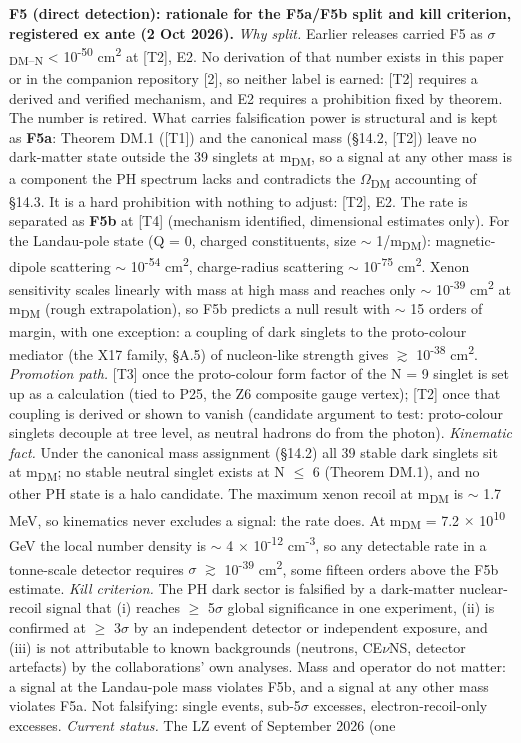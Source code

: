 \documentclass[11pt,letterpaper]{article}
\begin{document}
\noindent \textbf{F5 (direct detection): rationale for the F5a/F5b split and kill criterion, registered ex ante (2 Oct 2026). }\emph{Why split.} Earlier releases carried F5 as $\sigma$\textsubscript{DM--N} < 10\textsuperscript{-50} cm\textsuperscript{2} at [T2], E2. No derivation of that number exists in this paper or in the companion repository [2], so neither label is earned: [T2] requires a derived and verified mechanism, and E2 requires a prohibition fixed by theorem. The number is retired. What carries falsification power is structural and is kept as \textbf{F5a}: Theorem DM.1 ([T1]) and the canonical mass (§14.2, [T2]) leave no dark-matter state outside the 39 singlets at m\textsubscript{DM}, so a signal at any other mass is a component the PH spectrum lacks and contradicts the $\Omega$\textsubscript{DM} accounting of §14.3. It is a hard prohibition with nothing to adjust: [T2], E2. The rate is separated as \textbf{F5b} at [T4] (mechanism identified, dimensional estimates only). For the Landau-pole state (Q = 0, charged constituents, size $\sim$ 1/m\textsubscript{DM}): magnetic-dipole scattering $\sim$ 10\textsuperscript{-54} cm\textsuperscript{2}, charge-radius scattering $\sim$ 10\textsuperscript{-75} cm\textsuperscript{2}. Xenon sensitivity scales linearly with mass at high mass and reaches only $\sim$ 10\textsuperscript{-39} cm\textsuperscript{2} at m\textsubscript{DM} (rough extrapolation), so F5b predicts a null result with $\sim$ 15 orders of margin, with one exception: a coupling of dark singlets to the proto-colour mediator (the X17 family, §A.5) of nucleon-like strength gives $\gtrsim$ 10\textsuperscript{-38} cm\textsuperscript{2}. \emph{Promotion path.} [T3] once the proto-colour form factor of the N = 9 singlet is set up as a calculation (tied to P25, the Z6 composite gauge vertex); [T2] once that coupling is derived or shown to vanish (candidate argument to test: proto-colour singlets decouple at tree level, as neutral hadrons do from the photon). \emph{Kinematic fact.} Under the canonical mass assignment (§14.2) all 39 stable dark singlets sit at m\textsubscript{DM}; no stable neutral singlet exists at N $\le$ 6 (Theorem DM.1), and no other PH state is a halo candidate. The maximum xenon recoil at m\textsubscript{DM} is $\sim$ 1.7 MeV, so kinematics never excludes a signal: the rate does. At m\textsubscript{DM} = 7.2 $\times$ 10\textsuperscript{10} GeV the local number density is $\sim$ 4 $\times$ 10\textsuperscript{-12} cm\textsuperscript{-3}, so any detectable rate in a tonne-scale detector requires $\sigma$ $\gtrsim$ 10\textsuperscript{-39} cm\textsuperscript{2}, some fifteen orders above the F5b estimate. \emph{Kill criterion.} The PH dark sector is falsified by a dark-matter nuclear-recoil signal that (i) reaches $\ge$ 5$\sigma$ global significance in one experiment, (ii) is confirmed at $\ge$ 3$\sigma$ by an independent detector or independent exposure, and (iii) is not attributable to known backgrounds (neutrons, CE$\nu$NS, detector artefacts) by the collaborations' own analyses. Mass and operator do not matter: a signal at the Landau-pole mass violates F5b, and a signal at any other mass violates F5a. Not falsifying: single events, sub-5$\sigma$ excesses, electron-recoil-only excesses. \emph{Current status.} The LZ event of September 2026 (one 
\end{document}

